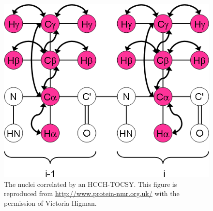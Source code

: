 \begin{figure}
  \includegraphics[scale=0.75]{figures/ccpn_hcchtocsy}
  \caption[The nuclei correlated by an HCCH-TOCSY.]
          {The nuclei correlated by an HCCH-TOCSY.
           This figure is reproduced from \url{http://www.protein-nmr.org.uk/}
           with the permission of Victoria Higman.}
  \label{ccpn_hcchtocsy}
\end{figure}

